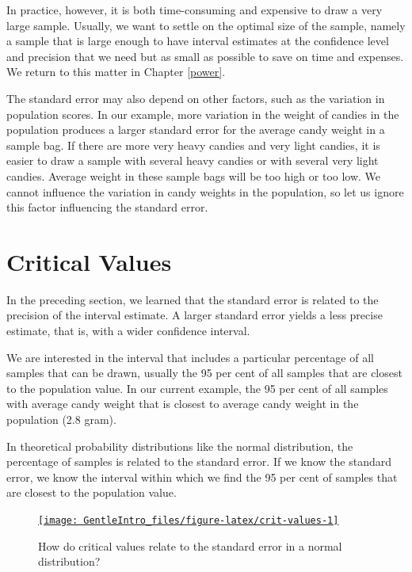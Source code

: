 \documentclass[a4paper]{book}
\theoremstyle{definition}
\theoremstyle{definition}
\theoremstyle{definition}
\theoremstyle{remark}
\begin{document}
In practice, however, it is both time-consuming and expensive to draw a
very large sample. Usually, we want to settle on the optimal size of the
sample, namely a sample that is large enough to have interval estimates
at the confidence level and precision that we need but as small as
possible to save on time and expenses. We return to this matter in
Chapter \ref{power}.

The standard error may also depend on other factors, such as the
variation in population scores. In our example, more variation in the
weight of candies in the population produces a larger standard error for
the average candy weight in a sample bag. If there are more very heavy
candies and very light candies, it is easier to draw a sample with
several heavy candies or with several very light candies. Average weight
in these sample bags will be too high or too low. We cannot influence
the variation in candy weights in the population, so let us ignore this
factor influencing the standard error.

\section{Critical Values}\label{crit-values}

In the preceding section, we learned that the standard error is related
to the precision of the interval estimate. A larger standard error
yields a less precise estimate, that is, with a wider confidence
interval.

We are interested in the interval that includes a particular percentage
of all samples that can be drawn, usually the 95 per cent of all samples
that are closest to the population value. In our current example, the 95
per cent of all samples with average candy weight that is closest to
average candy weight in the population (2.8 gram).

In theoretical probability distributions like the normal distribution,
the percentage of samples is related to the standard error. If we know
the standard error, we know the interval within which we find the 95 per
cent of samples that are closest to the population value.

\begin{figure}[H]
\href{http://82.196.4.233:3838/apps/crit-values/}{\texttt{[image: GentleIntro\_files/figure-latex/crit-values-1]} }\caption{How do critical values relate to the standard error in a normal distribution?}\label{fig:crit-values}
\end{figure}
\end{document}
